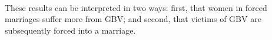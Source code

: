 \documentclass[11pt,a4paper]{scrartcl} %
\newcommand{\bibloc}{C:/Users/Koen/Dropbox/Literatuur/Mendeley/Bibtex/CongoGBV}
\begin{document}
\paragraph{}
These results can be interpreted in two ways: first, that women in forced marriages suffer more from GBV; and second, that victims of GBV are subsequently forced into a marriage.





\clearpage 


\end{document}
